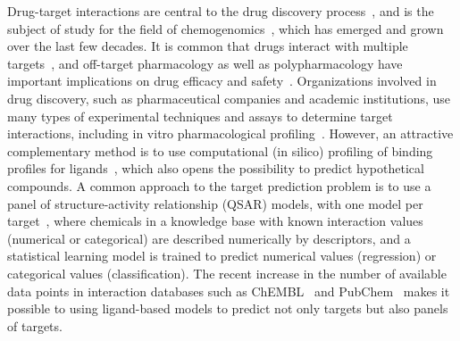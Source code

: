 \documentclass[utf8]{frontiersSCNS} %
\begin{document}
Drug-target interactions are central to the drug discovery
process~\cite{Yildirim:2007vh}, and is the subject of study for the field of
chemogenomics~\cite{Bredel2004}, which has emerged and grown over the last few decades. It is
common that drugs interact with multiple
targets~\cite{hopkins2008network}, and off-target pharmacology as well as
polypharmacology have important implications on drug efficacy and
safety~\cite{Peters:2013yg,Ravikumar:2018qd}. Organizations involved in drug
discovery, such as pharmaceutical companies and academic institutions, use many
types of experimental techniques and assays to determine target interactions,
including in vitro pharmacological profiling~\cite{Bowes2012}. However, an
attractive complementary method is to use computational (in silico) profiling
of binding profiles for ligands~\cite{Cereto-Massague:2015px}, which also opens the possibility
to predict hypothetical compounds. A common approach to the target prediction
problem is to use a panel of structure-activity relationship (QSAR)
models, with one model per target~\cite{HanschQSAR}, where chemicals in a
knowledge base with known interaction values (numerical or categorical) are
described numerically by descriptors, and a statistical learning model is
trained to predict numerical values (regression) or categorical values
(classification). The recent increase in the number of available data points
in interaction databases such as ChEMBL~\cite{Gaulton:2017tm} and
PubChem~\cite{Wang:2017cy} makes it possible to using ligand-based models to
predict not only targets but also panels of targets.
\end{document}
